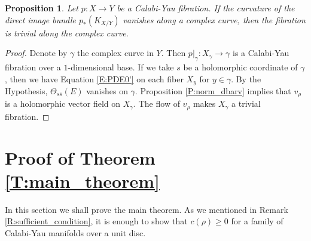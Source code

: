 \documentclass{amsart}
\newtheorem{proposition}[theorem]{Proposition}
\theoremstyle{definition}
\numberwithin{equation}{section}
\begin{document}
\begin{proposition}
Let $p:X\rightarrow Y$ be a Calabi-Yau fibration. If the curvature of the direct image bundle $p_*(K_{X/Y})$ vanishes along a complex curve, then the fibration is trivial along the complex curve.
\end{proposition}

\begin{proof}
Denote by $\gamma$ the complex curve in $Y$. Then $p\vert_\gamma:X_\gamma\rightarrow\gamma$ is a Calabi-Yau fibration over a $1$-dimensional base. If we take $s$ be a holomorphic coordinate of $\gamma$, then we have Equation \eqref{E:PDE0'} on each fiber $X_y$ for $y\in\gamma$. By the Hypothesis, $\Theta_{s\bar s}(E)$ vanishes on $\gamma$. Proposition \ref{P:norm_dbarv} implies that $v_\rho$ is a holomorphic vector field on $X_\gamma$. The flow of $v_\rho$ makes $X_\gamma$ a trivial fibration.
\end{proof}

\section{Proof of Theorem \ref{T:main_theorem}}

In this section we shall prove the main theorem. As we mentioned in Remark \ref{R:sufficient_condition}, it is enough to show that $c(\rho)\ge0$ for a family of Calabi-Yau manifolds over a unit disc. 
\end{document}

